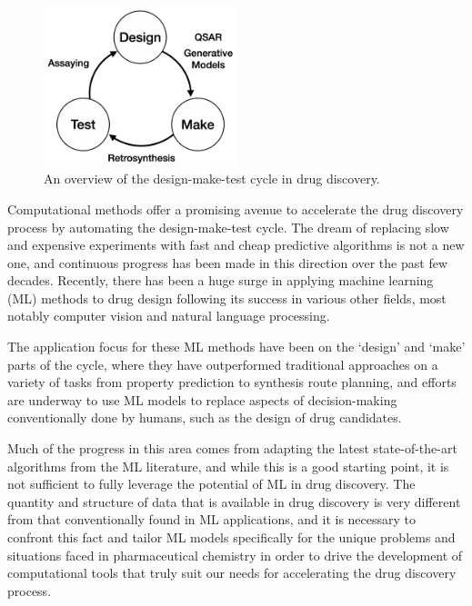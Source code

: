 \begin{figure}[!h] %
    \centering
    \includegraphics[width=0.5\textwidth]{Chapters/Intro/Figs/design-make-test.png}
    \caption{\label{fig:cycle} An overview of the design-make-test cycle in drug discovery.}
\end{figure}

Computational methods offer a promising avenue to accelerate the drug discovery process by automating the design-make-test cycle. The dream of replacing slow and expensive experiments with fast and cheap predictive algorithms is not a new one, and continuous progress has been made in this direction over the past few decades. Recently, there has been a huge surge in applying machine learning (ML) methods to drug design following its success in various other fields, most notably computer vision and natural language processing.

The application focus for these ML methods have been on the `design' and `make' parts of the cycle, where they have outperformed traditional approaches on a variety of tasks from property prediction to synthesis route planning, and efforts are underway to use ML models to replace aspects of decision-making conventionally done by humans, such as the design of drug candidates.

Much of the progress in this area comes from adapting the latest state-of-the-art algorithms from the ML literature, and while this is a good starting point, it is not sufficient to fully leverage the potential of ML in drug discovery. The quantity and structure of data that is available in drug discovery is very different from that conventionally found in ML applications, and it is necessary to confront this fact and tailor ML models specifically for the unique problems and situations faced in pharmaceutical chemistry in order to drive the development of computational tools that truly suit our needs for accelerating the drug discovery process.

